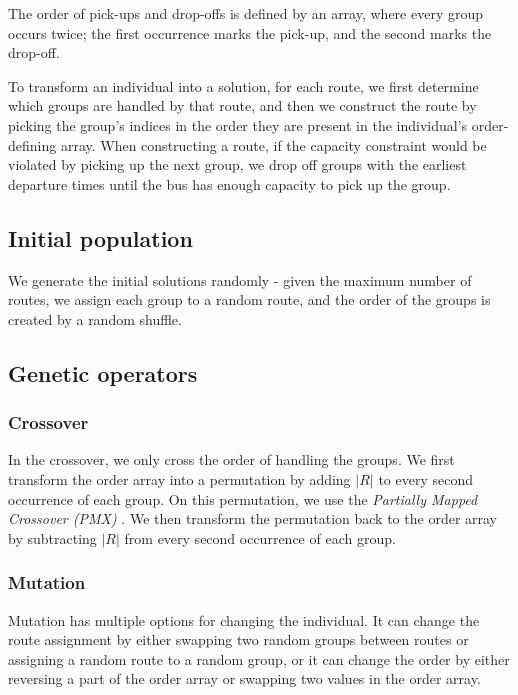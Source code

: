 The order of pick-ups and drop-offs is defined by an array, where every group occurs twice; the first occurrence marks the pick-up, and the second marks the drop-off.

To transform an individual into a solution, for each route, we first determine which groups are handled by that route, and then we construct the route by picking the group's indices in the order they are present in the individual's order-defining array. When constructing a route, if the capacity constraint would be violated by picking up the next group, we drop off groups with the earliest departure times until the bus has enough capacity to pick up the group.

\subsection{Initial population}

We generate the initial solutions randomly - given the maximum number of routes, we assign each group to a random route, and the order of the groups is created by a random shuffle.

\subsection{Genetic operators}

\subsubsection{Crossover}

In the crossover, we only cross the order of handling the groups. We first transform the order array into a permutation by adding $|R|$ to every second occurrence of each group. On this permutation, we use the \textit{Partially Mapped Crossover (PMX)} \cite{Goldberg1985AllelesLA}. We then transform the permutation back to the order array by subtracting $|R|$ from every second occurrence of each group.

\subsubsection{Mutation}

Mutation has multiple options for changing the individual. It can change the route assignment by either swapping two random groups between routes or assigning a random route to a random group, or it can change the order by either reversing a part of the order array or swapping two values in the order array.

